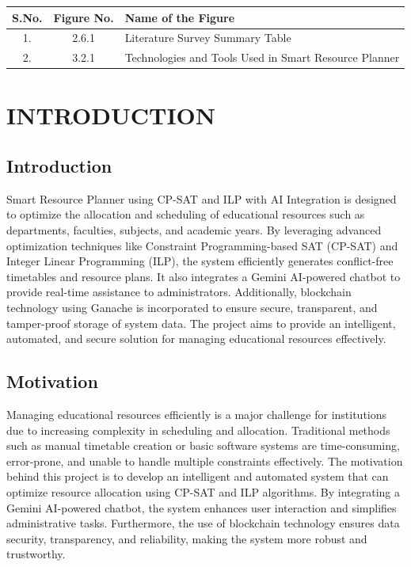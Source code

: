 \documentclass[a4paper, 12pt]{report}
\begin{document}
\begin{center}
\renewcommand{\arraystretch}{1.2}

\begin{tabular}{|c|c|p{12cm}|}
\hline
\textbf{S.No.} & \textbf{Figure No.} & \textbf{Name of the Figure} \\
\hline
1. & 2.6.1 & Literature Survey Summary Table \\ \hline
2. & 3.2.1 & Technologies and Tools Used in Smart Resource Planner \\ \hline


\end{tabular}
\end{center}

\newpage
{}


\chapter{INTRODUCTION}

\section{Introduction}
\par Smart Resource Planner using CP-SAT and ILP with AI Integration is designed to optimize the allocation and scheduling of educational resources such as departments, faculties, subjects, and academic years. By leveraging advanced optimization techniques like Constraint Programming-based SAT (CP-SAT) and Integer Linear Programming (ILP), the system efficiently generates conflict-free timetables and resource plans. It also integrates a Gemini AI-powered chatbot to provide real-time assistance to administrators. Additionally, blockchain technology using Ganache is incorporated to ensure secure, transparent, and tamper-proof storage of system data. The project aims to provide an intelligent, automated, and secure solution for managing educational resources effectively.

\section{Motivation}
\par Managing educational resources efficiently is a major challenge for institutions due to increasing complexity in scheduling and allocation. Traditional methods such as manual timetable creation or basic software systems are time-consuming, error-prone, and unable to handle multiple constraints effectively. The motivation behind this project is to develop an intelligent and automated system that can optimize resource allocation using CP-SAT and ILP algorithms. By integrating a Gemini AI-powered chatbot, the system enhances user interaction and simplifies administrative tasks. Furthermore, the use of blockchain technology ensures data security, transparency, and reliability, making the system more robust and trustworthy.
\end{document}
